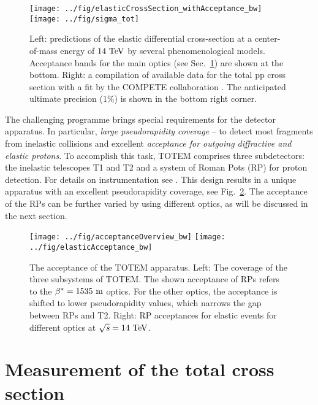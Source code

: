 \documentclass{desyproc}
\def\be{\beta}
\def\un#1{\ {\rm #1}}
\begin{document}
\begin{figure}[htb]
\centerline{\hss
	\texttt{[image: ../fig/elasticCrossSection\_withAcceptance\_bw]}\hfil
	\texttt{[image: ../fig/sigma\_tot]}\hss
}%
\vskip-3mm
\caption{Left: predictions of the elastic differential cross-section at a center-of-mass energy of $14\un{TeV}$ by several phenomenological models. Acceptance bands for the main optics (see Sec.~\ref{sec:meas}) are shown at the bottom. Right: a compilation of available data for the total pp cross section with a fit by the COMPETE collaboration \cite{cudell}. The anticipated ultimate precision ($1\%$) is shown in the bottom right corner.}%
\label{fig:why}%
\end{figure}

The challenging programme brings special requirements for the detector apparatus. In particular, {\em large pseudorapidity coverage} -- to detect most fragments from inelastic collisions and excellent {\em acceptance for outgoing diffractive and elastic protons}. To accomplish this task, TOTEM comprises three subdetectors: the inelastic telescopes T1 and T2 and a system of Roman Pots (RP) for proton detection. For details on instrumentation see \cite{tdr, jinst, gennaro}. This design results in a unique apparatus with an excellent pseudorapidity coverage, see Fig.~\ref{fig:acceptance}. The acceptance of the RPs can be further varied by using different optics, as will be discussed in the next section.

\begin{figure}[htb]
\centerline{\hss
	\texttt{[image: ../fig/acceptanceOverview\_bw]}\hfil
	\texttt{[image: ../fig/elasticAcceptance\_bw]}\hss
}%
\vskip-3mm
\caption{The acceptance of the TOTEM apparatus. Left: The coverage of the three subsystems of TOTEM. The shown acceptance of RPs refers to the $\be^*=1535\un{m}$ optics. For the other optics, the acceptance is shifted to lower pseudorapidity values, which narrows the gap between RPs and T2. Right: RP acceptances for elastic events for different optics at $\sqrt{s}=14\un{TeV}$.}%
\label{fig:acceptance}%
\end{figure}




\section{Measurement of the total cross section}
\label{sec:meas}
\end{document}
